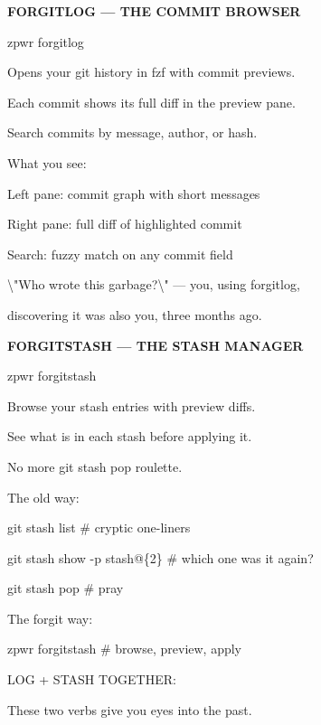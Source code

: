 \documentclass[11pt,a4paper,twoside]{book}
\begin{document}
\vspace{12pt}
{\bfseries\color{neonyellow} FORGITLOG — THE COMMIT BROWSER}\vspace{4pt}

\begin{codebox}
zpwr forgitlog\\
\end{codebox}

Opens your git history in fzf with commit previews.

Each commit shows its full diff in the preview pane.

Search commits by message, author, or hash.

What you see:

Left pane:  commit graph with short messages

Right pane: full diff of highlighted commit

Search:     fuzzy match on any commit field

\textbackslash{}"Who wrote this garbage?\textbackslash{}" — you, using forgitlog,

discovering it was also you, three months ago.


\vspace{12pt}
{\bfseries\color{neonyellow} FORGITSTASH — THE STASH MANAGER}\vspace{4pt}

\begin{codebox}
zpwr forgitstash\\
\end{codebox}

Browse your stash entries with preview diffs.

See what is in each stash before applying it.

No more git stash pop roulette.

The old way:

git stash list              \# cryptic one-liners

git stash show -p stash@\{2\}  \# which one was it again?

git stash pop               \# pray

The forgit way:

\begin{codebox}
zpwr forgitstash            \# browse, preview, apply\\
\end{codebox}

LOG + STASH TOGETHER:

These two verbs give you eyes into the past.
\end{document}

